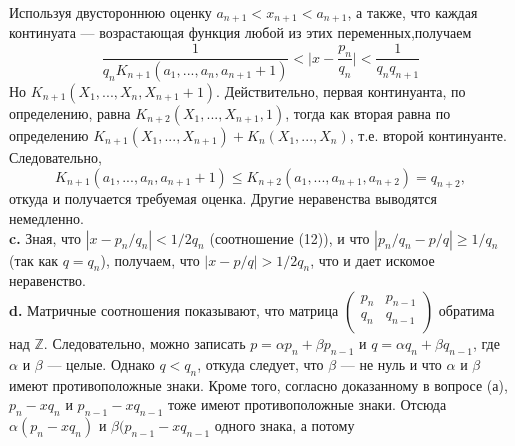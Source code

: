 \noindent
Используя двустороннюю оценку $a_{n+1}<x_{n+1}<a_{n+1}$, а также, что каждая\linebreak
континуата --- возрастающая функция любой из этих переменных,\linebreak получаем
$$\frac{1}{q_nK_{n+1}(a_1,...,a_n,a_{n+1}+1)}<\bigg|x-\frac{p_n}{q_n}\bigg|<\frac{1}{q_nq_{n+1}}$$
Но $K_{n+1}(X_1,...,X_n,X_{n+1}+1)$. Действительно, первая континуанта, по\linebreak
определению, равна $K_{n+2}(X_1,...,X_{n+1},1)$, тогда как вторая равна по\linebreak
определению $K_{n+1}(X_1,...,X_{n+1})+K_n(X_1,...,X_n)$, \:\:т.е. второй континуанте.\linebreak
Следовательно,
$$ K_{n+1}(a_1,...,a_n,a_{n+1}+1)\leqslant K_{n+2}(a_1,...,a_{n+1},a_{n+2})=q_{n+2},$$
откуда и получается требуемая оценка. Другие неравенства выводятся\linebreak
немедленно.\newline
\\
\hspace*{15pt}\textbf{c.} Зная, что $|x-p_n/q_n|<1/2q_n$ (соотношение (12)), и что\linebreak
$|p_n/q_n-p/q|\geqslant1/q_n$ (так как $q=q_n$), получаем, что $|x-p/q|>1/2q_n$,
что и дает искомое неравенство.\newline
\\
\hspace*{15pt}\textbf{d.} Матричные соотношения показывают, что матрица 
$\begin{pmatrix}
	p_n&  p_{n-1}\\
	q_n& q_{n-1}\\
\end{pmatrix}$\linebreak
обратима над $\mathbb{Z}$. Следовательно, можно записать $p=\alpha p_n+\beta p_{n-1}$ и \linebreak
$q=\alpha q_n+\beta q_{n-1}$, где $\alpha$ и $\beta$ — целые. Однако $q<q_n$, откуда следует,\linebreak
что $\beta$ — не нуль и что $\alpha$ и $\beta$ имеют противоположные знаки. Кроме\linebreak
того, согласно доказанному в вопросе (а), $p_n-xq_n$ и $p_{n-1}-xq_{n-1}$ тоже\linebreak
имеют противоположные знаки. Отсюда $\alpha(p_n-xq_n)$ и $\beta(p_{n-1}-xq_{n-1}$\linebreak
одного\:\: знака,\:\: а\:\: потому
